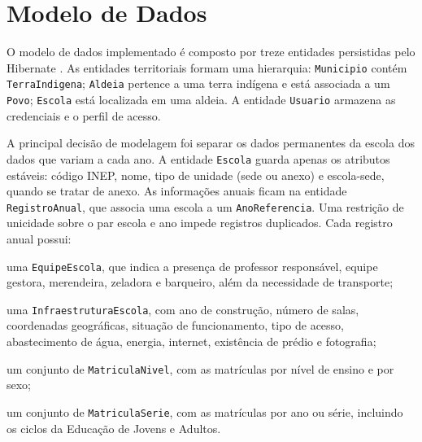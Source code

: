 
\section{Modelo de Dados}

O modelo de dados implementado é composto por treze entidades persistidas pelo Hibernate \cite{bauer2015}. As entidades territoriais formam uma hierarquia: \texttt{Municipio} contém \texttt{TerraIndigena}; \texttt{Aldeia} pertence a uma terra indígena e está associada a um \texttt{Povo}; \texttt{Escola} está localizada em uma aldeia. A entidade \texttt{Usuario} armazena as credenciais e o perfil de acesso.

A principal decisão de modelagem foi separar os dados permanentes da escola dos dados que variam a cada ano. A entidade \texttt{Escola} guarda apenas os atributos estáveis: código INEP, nome, tipo de unidade (sede ou anexo) e escola-sede, quando se tratar de anexo. As informações anuais ficam na entidade \texttt{RegistroAnual}, que associa uma escola a um \texttt{AnoReferencia}. Uma restrição de unicidade sobre o par escola e ano impede registros duplicados. Cada registro anual possui:

\begin{alineas}
  \item uma \texttt{EquipeEscola}, que indica a presença de professor responsável, equipe gestora, merendeira, zeladora e barqueiro, além da necessidade de transporte;
  \item uma \texttt{InfraestruturaEscola}, com ano de construção, número de salas, coordenadas geográficas, situação de funcionamento, tipo de acesso, abastecimento de água, energia, internet, existência de prédio e fotografia;
  \item um conjunto de \texttt{MatriculaNivel}, com as matrículas por nível de ensino e por sexo;
  \item um conjunto de \texttt{MatriculaSerie}, com as matrículas por ano ou série, incluindo os ciclos da Educação de Jovens e Adultos.
\end{alineas}

